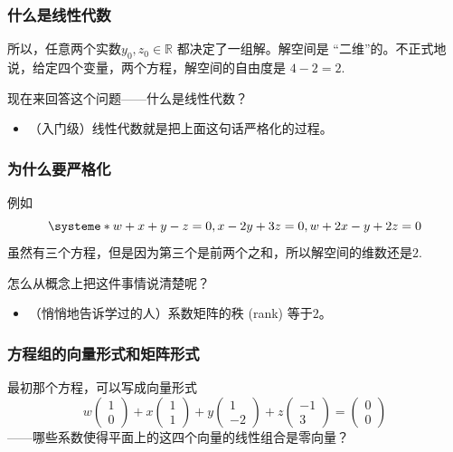 \documentclass[CJK]{beamer}
\begin{document}
\begin{frame}
\frametitle{什么是线性代数}
所以，任意两个实数$y_0, z_0\in \mathbb R$ 都决定了一组解。解空间是 ``\alert{二维}''的。不正式地说，给定四个\alert{变量}，两个\alert{方程}，解空间的\alert{自由度}是 $4 - 2 = 2.$

\vspace{12px}

现在来回答这个问题——什么是线性代数？

\begin{itemize}
    \item （入门级）线性代数就是把上面这句话\alert{严格化}的过程。
\end{itemize}

\end{frame}

\begin{frame}
\frametitle{为什么要严格化}
例如
\[
\systeme*{w + x + y - z = 0 , x - 2y + 3z = 0, w + 2x - y + 2z = 0}
\]
虽然有三个方程，但是因为\alert{第三个是前两个之和}，所以解空间的维数还是$2$. 

怎么从概念上把这件事情说清楚呢？

\begin{itemize}
    \item （悄悄地告诉学过的人）系数矩阵的秩 (rank) 等于$2$。
\end{itemize}

\end{frame}

\begin{frame}
\frametitle{方程组的向量形式和矩阵形式}
最初那个方程，可以写成\alert{向量形式}
\[
w\begin{pmatrix} 1 \\ 0 \end{pmatrix} + x \begin{pmatrix} 1  \\ 1 \end{pmatrix}+ y\begin{pmatrix} 1 \\ -2 \end{pmatrix} + z\begin{pmatrix} -1 \\ 3 \end{pmatrix} = \begin{pmatrix} 0 \\ 0 \end{pmatrix}
\]
——哪些系数使得平面上的这四个向量的\alert{线性组合}是零向量？

\end{frame}
\end{document}
